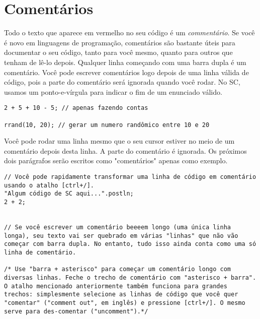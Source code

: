 \section{Comentários}

Todo o texto que aparece em vermelho no seu código é um \emph{commentário}. Se você é novo em linguagens de programação, comentários são bastante úteis para documentar o seu código, tanto para você mesmo, quanto para outros que tenham de lê-lo depois. Qualquer linha começando com uma barra dupla é um comentário. Você pode escrever comentários logo depois de uma linha válida de código, pois a parte do comentário será ignorada quando você rodar. No SC, usamos um ponto-e-vírgula para indicar o fim de um enunciado válido.

\begin{lstlisting}[style=SuperCollider-IDE, basicstyle=\scttfamily\footnotesize]
2 + 5 + 10 - 5; // apenas fazendo contas

rrand(10, 20); // gerar um numero randômico entre 10 e 20
\end{lstlisting}

Você pode rodar uma linha mesmo que o seu cursor estiver no meio de um comentário depois desta linha. A parte do comentário é ignorada. Os próximos dois parágrafos serão escritos como "comentários" apenas como exemplo.


 
\begin{lstlisting}[style=SuperCollider-IDE, basicstyle=\scttfamily\footnotesize]
// Você pode rapidamente transformar uma linha de código em comentário usando o atalho [ctrl+/].
"Algum código de SC aqui...".postln;
2 + 2;


// Se você escrever um comentário beeeem longo (uma única linha longa), seu texto vai ser quebrado em várias "linhas" que não vão começar com barra dupla. No entanto, tudo isso ainda conta como uma só linha de comentário.

/* Use "barra + asterisco" para começar um comentário longo com diversas linhas. Feche o trecho de comentário com "asterisco + barra". O atalho mencionado anteriormente também funciona para grandes trechos: simplesmente selecione as linhas de código que você quer "comentar" ("comment out", em inglês) e pressione [ctrl+/]. O mesmo serve para des-comentar ("uncomment").*/
\end{lstlisting}
